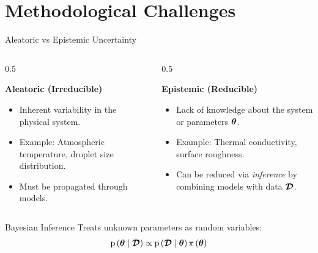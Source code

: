 \section{Methodological Challenges}

\begin{frame}{Aleatoric vs Epistemic Uncertainty}
    \begin{columns}
        \begin{column}{0.5\textwidth}
            
                \textbf{Aleatoric (Irreducible)}
                \begin{itemize}
                    \item Inherent variability in the physical system.
                    \item Example: Atmospheric temperature, droplet size distribution.
                    \item Must be propagated through models.
                \end{itemize}
        \end{column}
        \begin{column}{0.5\textwidth}
            
                \textbf{Epistemic (Reducible)}
                \begin{itemize}
                    \item Lack of knowledge about the system or parameters $\boldsymbol{\theta}$.
                    \item Example: Thermal conductivity, surface roughness.
                    \item Can be reduced via \textit{inference} by combining models with data $\boldsymbol{\mathcal{D}}$.
                \end{itemize}
        \end{column}
    \end{columns}
    \vspace{0.5cm}
    \begin{block}{Bayesian Inference}
        Treats unknown parameters as random variables:
        $$ \text{p} \left( \boldsymbol{\theta} \mid \boldsymbol{\mathcal{D}} \right) \propto \text{p} \left( \boldsymbol{\mathcal{D}} \mid \boldsymbol{\theta} \right) \pi \left( \boldsymbol{\theta}\right) $$
    \end{block}
\end{frame}

